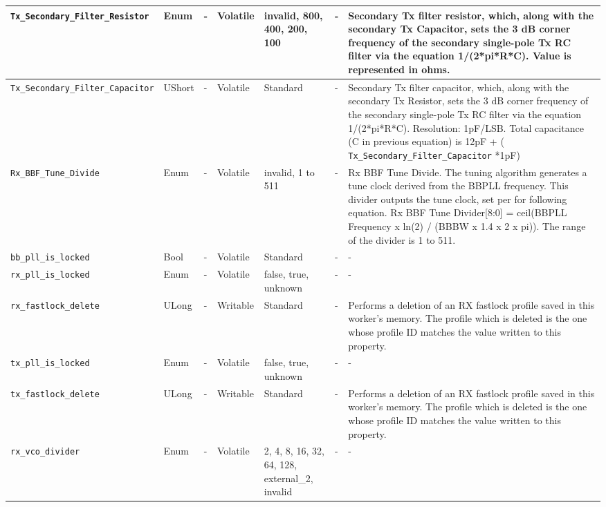 \documentclass{article}
\begin{document}
\begin{landscape}
\begin{scriptsize}
\begin{longtable}{|p{3.6cm}|p{8.1cm}|p{1.4cm}|p{1.3cm}|p{1.4cm}|p{2.5cm}|p{3.6cm}|}
			\hline
			\verb+Tx_Secondary_Filter_Resistor+ & Enum & - & Volatile & invalid, 800, 400, 200, 100 & - & Secondary Tx filter resistor, which, along with the secondary Tx Capacitor, sets the 3 dB corner frequency of the secondary single-pole Tx RC filter via the equation 1/(2*pi*R*C). Value is represented in ohms. \\
			\hline
			\verb+Tx_Secondary_Filter_Capacitor+ & UShort & - & Volatile & Standard & - &
Secondary Tx filter capacitor, which, along with the secondary Tx Resistor, sets the 3 dB corner frequency of the secondary single-pole Tx RC filter via the equation 1/(2*pi*R*C). Resolution: 1pF/LSB. Total capacitance (C in previous equation) is 12pF + ( \verb+Tx_Secondary_Filter_Capacitor+ *1pF) \\
			\hline
			\verb+Rx_BBF_Tune_Divide+ & Enum & - & Volatile & invalid, 1 to 511 & - &
                                      Rx BBF Tune Divide. The
                                        tuning algorithm generates a tune clock
                                        derived from the BBPLL frequency. This
                                        divider outputs the tune clock, set per
                                        for following equation. Rx BBF Tune
                                        Divider[8:0] = ceil(BBPLL Frequency x
                                        ln(2) / (BBBW x 1.4 x 2 x pi)). The
                                        range of the divider is 1 to 511. \\
			\hline
			\verb+bb_pll_is_locked+ & Bool & - & Volatile & Standard & - & - \\
			\hline
			\verb+rx_pll_is_locked+ & Enum & - & Volatile & false, true, unknown & - & - \\
			\hline
			\verb+rx_fastlock_delete+ & ULong & - & Writable & Standard & - & Performs a deletion of an RX fastlock profile saved in this worker's memory. The profile which is deleted is the one whose profile ID matches the value written to this property. \\
			\hline
			\verb+tx_pll_is_locked+ & Enum & - & Volatile & false, true, unknown & - & - \\
			\hline
			\verb+tx_fastlock_delete+ & ULong & - & Writable & Standard & - & Performs a deletion of an RX fastlock profile saved in this worker's memory. The profile which is deleted is the one whose profile ID matches the value written to this property. \\
			\hline
			\verb+rx_vco_divider+ & Enum & - & Volatile & 2, 4, 8, 16, 32, 64, 128, external\_2, invalid & - & - \\

\end{longtable}
\end{scriptsize}
\end{landscape}
\end{document}
